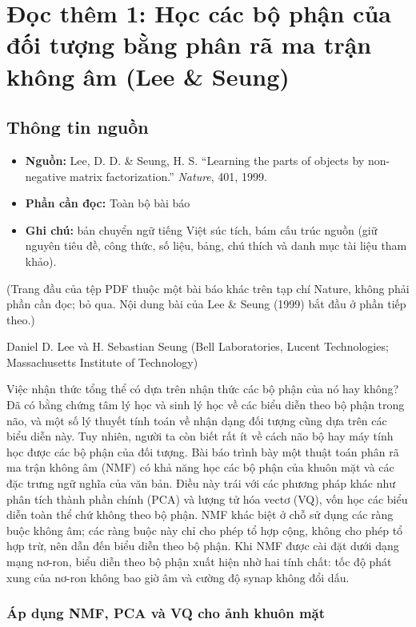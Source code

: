 \chapter{Đọc thêm 1: Học các bộ phận của đối tượng bằng phân rã ma trận không âm (Lee \& Seung)}
\label{ch:M5L1DocThem1}

\section{Thông tin nguồn}

\begin{itemize}
  \item \textbf{Nguồn:} Lee, D. D. \& Seung, H. S. ``Learning the parts of objects by non-negative matrix factorization.'' \emph{Nature}, 401, 1999.
  \item \textbf{Phần cần đọc:} Toàn bộ bài báo
  \item \textbf{Ghi chú:} bản chuyển ngữ tiếng Việt súc tích, bám cấu trúc nguồn (giữ nguyên tiêu đề, công thức, số liệu, bảng, chú thích và danh mục tài liệu tham khảo).
\end{itemize}

(Trang đầu của tệp PDF thuộc một bài báo khác trên tạp chí Nature, không phải phần cần đọc; bỏ qua. Nội dung bài của Lee \& Seung (1999) bắt đầu ở phần tiếp theo.)

Daniel D. Lee và H. Sebastian Seung (Bell Laboratories, Lucent Technologies; Massachusetts Institute of Technology)

Việc nhận thức tổng thể có dựa trên nhận thức các bộ phận của nó hay không? Đã có bằng chứng tâm lý học và sinh lý học về các biểu diễn theo bộ phận trong não, và một số lý thuyết tính toán về nhận dạng đối tượng cũng dựa trên các biểu diễn này. Tuy nhiên, người ta còn biết rất ít về cách não bộ hay máy tính học được các bộ phận của đối tượng. Bài báo trình bày một thuật toán phân rã ma trận không âm (NMF) có khả năng học các bộ phận của khuôn mặt và các đặc trưng ngữ nghĩa của văn bản. Điều này trái với các phương pháp khác như phân tích thành phần chính (PCA) và lượng tử hóa vectơ (VQ), vốn học các biểu diễn toàn thể chứ không theo bộ phận. NMF khác biệt ở chỗ sử dụng các ràng buộc không âm; các ràng buộc này chỉ cho phép tổ hợp cộng, không cho phép tổ hợp trừ, nên dẫn đến biểu diễn theo bộ phận. Khi NMF được cài đặt dưới dạng mạng nơ-ron, biểu diễn theo bộ phận xuất hiện nhờ hai tính chất: tốc độ phát xung của nơ-ron không bao giờ âm và cường độ synap không đổi dấu.

\subsection{Áp dụng NMF, PCA và VQ cho ảnh khuôn mặt}

